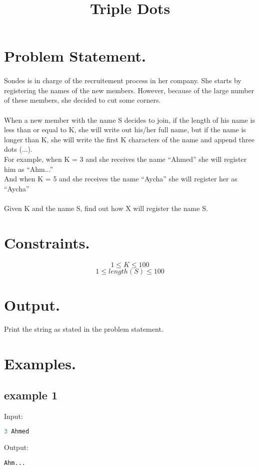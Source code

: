\documentclass[10pt]{article}
\begin{document}
\title{Triple Dots}
 \date{}
\maketitle
\section{Problem Statement.}
\paragraph{}
Sondes is in charge of the recruitement process in her company. She starts by registering the names of the new members.
However, because of the large number of these members, she decided to cut some corners.
\paragraph{}
When a new member with the name S decides to join, if the length of his name is less than or equal to K, she will write out his/her full name, but if the name is longer than K, she will write the first K characters of the name and append three dots (...).\\
For example, when K = 3 and she receives the name “Ahmed” she will register him as “Ahm...”\\
And when K = 5 and she receives the name “Aycha” she will register her as “Aycha”\\
\paragraph{}
Given K and the name S, find out how X will register the name S.
\paragraph{}
\section{Constraints.}
$$ 1\le K \le 100 $$
$$ 1\le length(S) \le 100 $$
\section{Output.}
Print the string as stated in the problem statement.
\section{Examples.}
\subsection{example 1}
Input:
\begin{lstlisting}[language=Python]
3 Ahmed
\end{lstlisting}
Output:
\begin{lstlisting}[language=Python]
Ahm...
\end{lstlisting}
\end{document}
